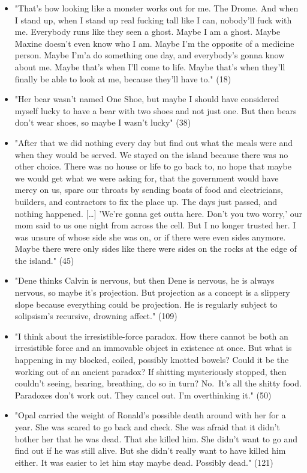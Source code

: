 \documentclass[letterpaper]{article}
\begin{document}
\begin{itemize}
\item "That's how looking like a monster works out for me. The Drome. And
when I stand up, when I stand up real fucking tall like I can,
nobody'll fuck with me. Everybody runs like they seen a ghost. Maybe I
am a ghost. Maybe Maxine doesn't even know who I am. Maybe I'm the
opposite of a medicine person. Maybe I'm'a do something one day, and
everybody's gonna know about me. Maybe that's when I'll come to life.
Maybe that's when they'll finally be able to look at me, because
they'll have to." (18)\\
\item "Her bear wasn't named One Shoe, but maybe I should have considered
myself lucky to have a bear with two shoes and not just one. But then
bears don't wear shoes, so maybe I wasn't lucky" (38)
\item "After that we did nothing every day but find out what the meals were
and when they would be served. We stayed on the island because there
was no other choice. There was no house or life to go back to, no hope
that maybe we would get what we were asking for, that the government
would have mercy on us, spare our throats by sending boats of food and
electricians, builders, and contractors to fix the place up. The days
just passed, and nothing happened. [\ldots{}] 'We're gonna get outta here.
Don't you two worry,' our mom said to us one night from across the
cell. But I no longer trusted her. I was unsure of whose side she was
on, or if there were even sides anymore. Maybe there were only sides
like there were sides on the rocks at the edge of the island." (45)
\item "Dene thinks Calvin is nervous, but then Dene is nervous, he is always
nervous, so maybe it's projection. But projection as a concept is a
slippery slope because everything could be projection. He is regularly
subject to solipsism's recursive, drowning affect." (109)
\item "I think about the irresistible-force paradox. How there cannot be
both an irresistible force and an immovable object in existence at
once. But what is happening in my blocked, coiled, possibly knotted
bowels? Could it be the working out of an ancient paradox? If shitting
mysteriously stopped, then couldn't seeing, hearing, breathing, do so
in turn? No. It's all the shitty food. Paradoxes don't work out. They
cancel out. I'm overthinking it." (50)
\item "Opal carried the weight of Ronald's possible death around with her
for a year. She was scared to go back and check. She was afraid that
it didn't bother her that he was dead. That she killed him. She didn't
want to go and find out if he was still alive. But she didn't really
want to have killed him either. It was easier to let him stay maybe
dead. Possibly dead." (121)
\end{itemize}
\end{document}

